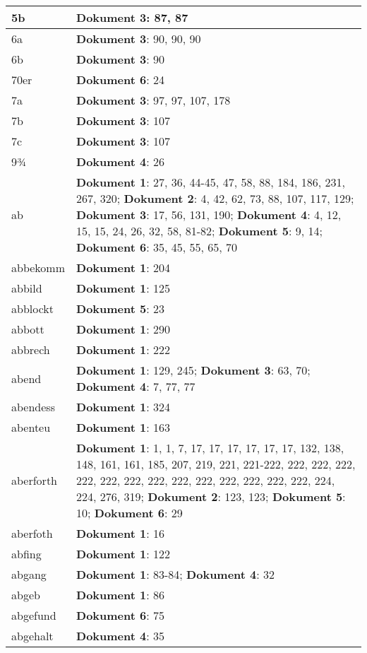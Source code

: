 \documentclass[a5paper]{article}
\begin{document}
\begin{longtable}[l]{|l|p{3in}|}
\hline
5b & \textbf{Dokument 3}: 87, 87 \\
\hline
6a & \textbf{Dokument 3}: 90, 90, 90 \\
\hline
6b & \textbf{Dokument 3}: 90 \\
\hline
70er & \textbf{Dokument 6}: 24 \\
\hline
7a & \textbf{Dokument 3}: 97, 97, 107, 178 \\
\hline
7b & \textbf{Dokument 3}: 107 \\
\hline
7c & \textbf{Dokument 3}: 107 \\
\hline
9¾ & \textbf{Dokument 4}: 26 \\
\hline
ab & \textbf{Dokument 1}: 27, 36, 44-45, 47, 58, 88, 184, 186, 231, 267, 320; \textbf{Dokument 2}: 4, 42, 62, 73, 88, 107, 117, 129; \textbf{Dokument 3}: 17, 56, 131, 190; \textbf{Dokument 4}: 4, 12, 15, 15, 24, 26, 32, 58, 81-82; \textbf{Dokument 5}: 9, 14; \textbf{Dokument 6}: 35, 45, 55, 65, 70 \\
\hline
abbekomm & \textbf{Dokument 1}: 204 \\
\hline
abbild & \textbf{Dokument 1}: 125 \\
\hline
abblockt & \textbf{Dokument 5}: 23 \\
\hline
abbott & \textbf{Dokument 1}: 290 \\
\hline
abbrech & \textbf{Dokument 1}: 222 \\
\hline
abend & \textbf{Dokument 1}: 129, 245; \textbf{Dokument 3}: 63, 70; \textbf{Dokument 4}: 7, 77, 77 \\
\hline
abendess & \textbf{Dokument 1}: 324 \\
\hline
abenteu & \textbf{Dokument 1}: 163 \\
\hline
aberforth & \textbf{Dokument 1}: 1, 1, 7, 17, 17, 17, 17, 17, 17, 132, 138, 148, 161, 161, 185, 207, 219, 221, 221-222, 222, 222, 222, 222, 222, 222, 222, 222, 222, 222, 222, 222, 222, 224, 224, 276, 319; \textbf{Dokument 2}: 123, 123; \textbf{Dokument 5}: 10; \textbf{Dokument 6}: 29 \\
\hline
aberfoth & \textbf{Dokument 1}: 16 \\
\hline
abfing & \textbf{Dokument 1}: 122 \\
\hline
abgang & \textbf{Dokument 1}: 83-84; \textbf{Dokument 4}: 32 \\
\hline
abgeb & \textbf{Dokument 1}: 86 \\
\hline
abgefund & \textbf{Dokument 6}: 75 \\
\hline
abgehalt & \textbf{Dokument 4}: 35 \\

\end{longtable}
\end{document}
